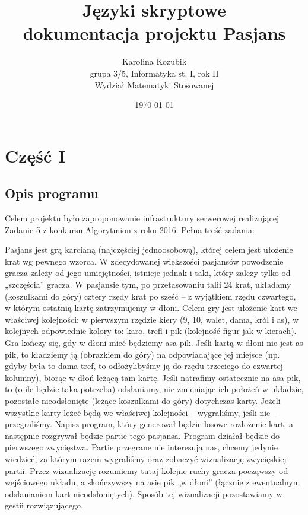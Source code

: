 \documentclass[12pt,a4paper]{article}
\begin{document}
	
\title{Języki skryptowe\\\small{dokumentacja projektu Pasjans}}
\author{Karolina Kozubik\\grupa 3/5, Informatyka st. I, rok II\\Wydział Matematyki Stosowanej}
\date{\today}

\maketitle
\newpage
\section*{Część I}
\subsection*{Opis programu}
Celem projektu było zaproponowanie infrastruktury serwerowej realizującej Zadanie 5 z konkursu Algorytmion z roku 2016. Pełna treść zadania:

Pasjans jest grą karcianą (najczęściej jednoosobową), której celem jest ułożenie krat wg pewnego wzorca. W zdecydowanej większości pasjansów powodzenie gracza zależy od jego umiejętności, istnieje jednak i taki, który zależy tylko od „szczęścia” gracza. W pasjansie tym, po przetasowaniu talii 24 krat, układamy (koszulkami do góry) cztery rzędy krat po sześć – z wyjątkiem rzędu czwartego, w którym ostatnią kartę zatrzymujemy w dłoni. Celem gry jest ułożenie kart we właściwej kolejności: w pierwszym rzędzie kiery (9, 10, walet, dama, król i as), w kolejnych odpowiednie kolory to: karo, trefl i pik (kolejność figur jak w kierach). Gra kończy się, gdy w dłoni mieć będziemy asa pik. Jeśli kartą w dłoni nie jest as pik, to kładziemy ją (obrazkiem do góry) na odpowiadające jej miejsce (np. gdyby była to dama tref, to odłożylibyśmy ją do rzędu trzeciego do czwartej kolumny), biorąc w dłoń leżącą tam kartę. Jeśli natrafimy ostatecznie na asa pik, to (o ile będzie taka potrzeba) odsłaniamy, nie zmieniając ich położeń w układzie, pozostałe nieodsłonięte (leżące koszulkami do góry) dotychczas karty. Jeżeli wszystkie karty leżeć będą we właściwej kolejności – wygraliśmy, jeśli nie – przegraliśmy. Napisz program, który generował będzie losowe rozłożenie kart, a następnie rozgrywał będzie partie tego pasjansa. Program działał będzie do pierwszego zwycięstwa. Partie przegrane nie interesują nas, chcemy jedynie wiedzieć, za którym razem wygraliśmy oraz zobaczyć wizualizację zwycięskiej partii. Przez wizualizację rozumiemy tutaj kolejne ruchy gracza począwszy od wejściowego układu, a skończywszy na asie pik „w dłoni” (łącznie z ewentualnym odsłanianiem kart nieodsłoniętych). Sposób tej wizualizacji pozostawiamy w gestii rozwiązującego. \cite{algorytmion}
\end{document}
